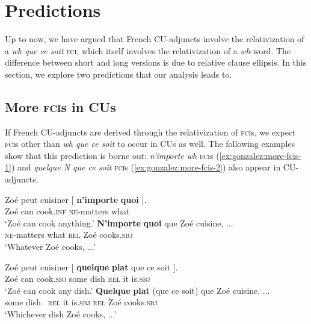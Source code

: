 \documentclass[output=paper]{langscibook}
\begin{document}
\section{Predictions}\label{sec:gonzalez:6}

Up to now, we have argued that French CU-adjuncts involve the relativization of a \emph{wh que ce soit} \textsc{fci}, which itself involves the relativization of a \emph{wh}-word. The difference between short and long versions is due to relative clause ellipsis. In this section, we explore two predictions that our analysis leads to.




\subsection{More \textsc{fci}s in CUs}

If French CU-adjuncts are derived through the relativization of \textsc{fci}s, we expect \textsc{fci}s other than \emph{wh que ce soit} to occur in CUs as well. The following examples show that this prediction is borne out: \emph{n'importe wh} \textsc{fci}s  \citep{muller2006} (\ref{ex:gonzalez:more-fcis-1}) and \emph{quelque N que ce soit} \textsc{fci}s (\ref{ex:gonzalez:more-fcis-2}) also appear in CU-adjuncts. 


\ea \label{ex:gonzalez:more-fcis-1}
\ea \gll Zoé peut cuisiner $[$ \textbf{n'importe} \textbf{quoi} $]$. \\
 Zoé can cook.\textsc{inf} {} \textsc{ne}-matters what \\ 
\glt `Zoé can cook anything.' 
\ex
\gll  \textbf{N'importe} \textbf{quoi}  que Zoé cuisine, ...  \\
  \textsc{ne}-matters what \textsc{rel} Zoé cooks.\textsc{sbj} \\ \jambox{[CU]}
\glt `Whatever Zoé cooks, ...' \\
\z 

\z


\ea \label{ex:gonzalez:more-fcis-2}
\ea \gll  Zoé peut cuisiner $[$ \textbf{quelque} \textbf{plat}  que ce soit $]$. \\ 
Zoé can cook.\textsc{sbj}  {} some dish \textsc{rel} it is.\textsc{sbj} \\ 
\glt `Zoé can cook any dish.'
\ex \gll \textbf{Quelque} \textbf{plat}  {(que ce soit)}  que Zoé cuisine, ... \label{ex:gonzalez:more-fcis-2b}\\
 some dish {~\textsc{rel} it is.\textsc{sbj}} \textsc{rel} Zoé cooks.\textsc{sbj}  \\ \jambox{[CU]}
\glt `Whichever dish Zoé cooks, ...'
\z 
\end{document}
